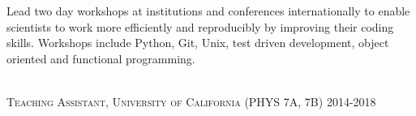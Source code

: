 \documentclass[10pt]{cv}
\begin{document}
\begin{llist}
\begin{minipage}[l]{0.7\textwidth}\vspace{0.15cm}
Lead two day workshops at institutions and conferences internationally to enable scientists to work more efficiently and reproducibly by improving their coding skills. Workshops include Python, Git, Unix, test driven development, object oriented and functional programming. \\
\end{minipage}\vspace{0.15cm}
\\
\textsc{Teaching Assistant, University of California} (PHYS 7A, 7B) \hfill 2014-2018\\
\begin{minipage}[l]{0.7\textwidth}\vspace{0.15cm}

\end{minipage}
\end{llist}
\end{document}
